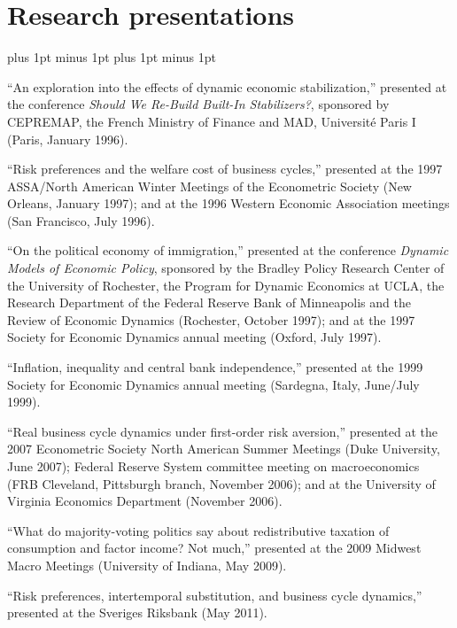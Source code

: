 \documentclass[letterpaper]{article}
\renewenvironment{itemize}{
  \begin{list}{}{
    \setlength{\leftmargin}{1.5em}
    \itemsep -1pt plus 1pt minus 1pt
    \topsep -1pt plus 1pt minus 1pt
  }
}{
  \end{list}
}
\begin{document}
\section*{Research presentations}
\begin{itemize}
\item ``An exploration into the effects of dynamic economic stabilization,'' presented at the conference \textit{Should We Re-Build Built-In Stabilizers?}, sponsored by CEPREMAP, the French Ministry of Finance and MAD, Universit{\'e} Paris I (Paris, January 1996).

\item ``Risk preferences and the welfare cost of business cycles,'' presented at the 1997 ASSA/North American Winter Meetings of the Econometric Society (New Orleans, January 1997); and at the 1996 Western Economic Association meetings (San Francisco, July 1996).

\item ``On the political economy of immigration,'' presented at the conference \textit{Dynamic Models of Economic Policy}, sponsored by the Bradley Policy Research Center of the University of Rochester, the Program for Dynamic Economics at UCLA, the Research Department of the Federal Reserve Bank of Minneapolis and the Review of Economic Dynamics (Rochester, October 1997); and at the 1997 Society for Economic Dynamics annual meeting (Oxford, July 1997).

\item ``Inflation, inequality and central bank independence,'' presented at the 1999 Society for Economic Dynamics annual meeting (Sardegna, Italy, June/July 1999).

\item ``Real business cycle dynamics under first-order risk aversion,'' presented at the 2007 Econometric Society North American Summer Meetings (Duke University, June 2007); Federal Reserve System committee meeting on macroeconomics (FRB Cleveland, Pittsburgh branch, November 2006); and at the University of Virginia Economics Department (November 2006).

\item ``What do majority-voting politics say about redistributive taxation of consumption and factor income? Not much,'' presented at the 2009 Midwest Macro Meetings (University of Indiana, May 2009).

\item ``Risk preferences, intertemporal substitution, and business cycle dynamics,'' presented at the Sveriges Riksbank (May 2011).


\end{itemize}
\end{document}
